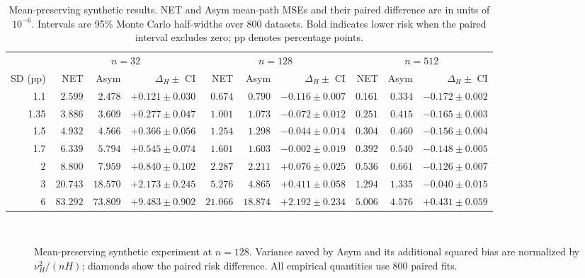 \begin{table}[!t]
\centering
\caption{Mean-preserving synthetic results. NET and Asym mean-path MSEs and their paired difference are in units of $10^{-6}$. Intervals are 95\% Monte Carlo half-widths over 800 datasets. Bold indicates lower risk when the paired interval excludes zero; pp denotes percentage points.}
\label{tab:main}
\begingroup\fontsize{8.9}{10.1}\selectfont\setlength{\tabcolsep}{3.5pt}
\begin{tabular}{r rrr rrr rrr}
\toprule
& \multicolumn{3}{c}{$n=32$} & \multicolumn{3}{c}{$n=128$} & \multicolumn{3}{c}{$n=512$}\\
\cmidrule(lr){2-4}\cmidrule(lr){5-7}\cmidrule(lr){8-10}
SD (pp) & NET & Asym & $\Delta_H\pm$ CI & NET & Asym & $\Delta_H\pm$ CI & NET & Asym & $\Delta_H\pm$ CI\\
\midrule
1.1 & $2.599$ & $\mathbf{2.478}$ & $+0.121\!\pm\!0.030$ & $\mathbf{0.674}$ & $0.790$ & $-0.116\!\pm\!0.007$ & $\mathbf{0.161}$ & $0.334$ & $-0.172\!\pm\!0.002$\\
1.35 & $3.886$ & $\mathbf{3.609}$ & $+0.277\!\pm\!0.047$ & $\mathbf{1.001}$ & $1.073$ & $-0.072\!\pm\!0.012$ & $\mathbf{0.251}$ & $0.415$ & $-0.165\!\pm\!0.003$\\
1.5 & $4.932$ & $\mathbf{4.566}$ & $+0.366\!\pm\!0.056$ & $\mathbf{1.254}$ & $1.298$ & $-0.044\!\pm\!0.014$ & $\mathbf{0.304}$ & $0.460$ & $-0.156\!\pm\!0.004$\\
1.7 & $6.339$ & $\mathbf{5.794}$ & $+0.545\!\pm\!0.074$ & $1.601$ & $1.603$ & $-0.002\!\pm\!0.019$ & $\mathbf{0.392}$ & $0.540$ & $-0.148\!\pm\!0.005$\\
2 & $8.800$ & $\mathbf{7.959}$ & $+0.840\!\pm\!0.102$ & $2.287$ & $\mathbf{2.211}$ & $+0.076\!\pm\!0.025$ & $\mathbf{0.536}$ & $0.661$ & $-0.126\!\pm\!0.007$\\
3 & $20.743$ & $\mathbf{18.570}$ & $+2.173\!\pm\!0.245$ & $5.276$ & $\mathbf{4.865}$ & $+0.411\!\pm\!0.058$ & $\mathbf{1.294}$ & $1.335$ & $-0.040\!\pm\!0.015$\\
6 & $83.292$ & $\mathbf{73.809}$ & $+9.483\!\pm\!0.902$ & $21.066$ & $\mathbf{18.874}$ & $+2.192\!\pm\!0.234$ & $5.006$ & $\mathbf{4.576}$ & $+0.431\!\pm\!0.059$\\
\bottomrule
\end{tabular}\endgroup
\end{table}

\begin{figure}[!t]
\centering
{}\\[-1pt]
\caption{Mean-preserving synthetic experiment at $n=128$. Variance saved by Asym and its additional squared bias are normalized by $\nu_H^2/(nH)$; diamonds show the paired risk difference. All empirical quantities use 800 paired fits.}
\label{fig:risk}
\end{figure}

